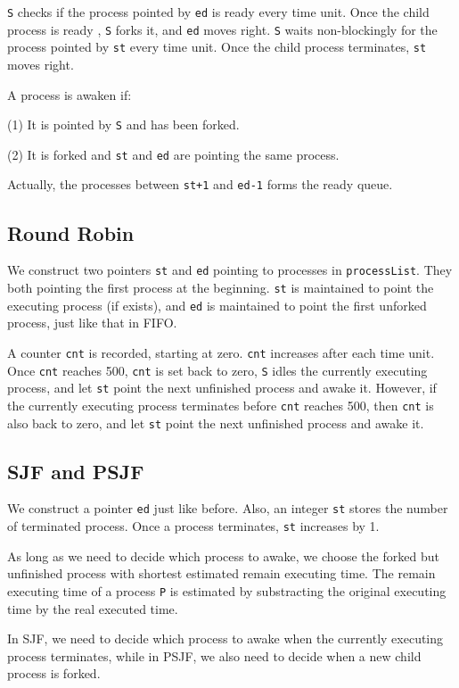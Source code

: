 \documentclass{article}
\begin{document}
        {\tt S} checks if the process pointed by {\tt ed} is ready every time unit. Once the child process is ready , {\tt S} forks it, and {\tt ed} moves right. {\tt S} waits non-blockingly for the process pointed by {\tt st} every time unit. Once the child process terminates, {\tt st} moves right.

        A process is awaken if: 

        (1) It is pointed by {\tt S} and has been forked.

        (2) It is forked and {\tt st} and {\tt ed} are pointing the same process.

        Actually, the processes between {\tt st+1} and {\tt ed-1} forms the ready queue.

    \subsection{Round Robin}
        We construct two pointers {\tt st} and {\tt ed} pointing to processes in {\tt processList}. They both pointing the first process at the beginning. {\tt st} is maintained to point the executing process (if exists), and {\tt ed} is maintained to point the first unforked process, just like that in FIFO.

        A counter {\tt cnt} is recorded, starting at zero. {\tt cnt} increases after each time unit. Once {\tt cnt} reaches 500, {\tt cnt} is set back to zero, {\tt S} idles the currently executing process, and let {\tt st} point the next unfinished process and awake it. However, if the currently executing process terminates before {\tt cnt} reaches 500, then {\tt cnt} is also back to zero, and let {\tt st} point the next unfinished process and awake it.

    \subsection{SJF and PSJF}
        We construct a pointer {\tt ed} just like before. Also, an integer {\tt st} stores the number of terminated process. Once a process terminates, {\tt st} increases by 1.

        As long as we need to decide which process to awake, we choose the forked but unfinished process with shortest estimated remain executing time. The remain executing time of a process {\tt P} is estimated by substracting the original executing time by the real executed time.
        
        In SJF, we need to decide which process to awake when the currently executing process terminates, while in PSJF, we also need to decide when a new child process is forked.
\end{document}
